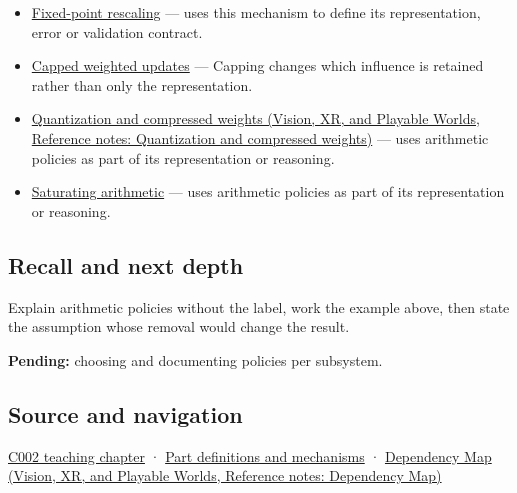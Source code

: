 \begin{itemize}
\item
  \hyperref[appendix-3333db47830f]{Fixed-point rescaling} --- uses this mechanism to define its representation, error or validation contract.
\item
  \hyperref[appendix-1e45d0613db3]{Capped weighted updates} --- Capping changes which influence is retained rather than only the representation.
\item
  \href{../07-Vision-XR-and-Playable-Worlds/main.pdf\#nameddest=appendix-fdc7879e8bf2}{Quantization and compressed weights (Vision, XR, and Playable Worlds, Reference notes: Quantization and compressed weights)} --- uses arithmetic policies as part of its representation or reasoning.
\item
  \hyperref[appendix-3999c6209649]{Saturating arithmetic} --- uses arithmetic policies as part of its representation or reasoning.
\end{itemize}

\subsection{Recall and next depth}\label{appendix-2ed044358b82-recall-and-next-depth}

Explain arithmetic policies without the label, work the example above, then state the assumption whose removal would change the result.

\textbf{Pending:} choosing and documenting policies per subsystem.

\subsection{Source and navigation}\label{appendix-2ed044358b82-source-and-navigation}

\hyperref[01-foundations-i-ch001-arithmetic-becomes-a-policy]{C002 teaching chapter} · \hyperref[appendix-fd090d982a15]{Part definitions and mechanisms} · \href{../07-Vision-XR-and-Playable-Worlds/main.pdf\#nameddest=appendix-4ad47bdd269a}{Dependency Map (Vision, XR, and Playable Worlds, Reference notes: Dependency Map)}
